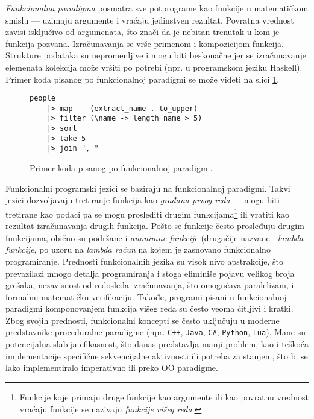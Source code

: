 \emph{Funkcionalna paradigma} posmatra sve potprograme kao funkcije u matematičkom smislu --- uzimaju argumente i vraćaju jedinstven rezultat. Povratna vrednost zavisi isključivo od argumenata, što znači da je nebitan trenutak u kom je funkcija pozvana. Izračunavanja se vrše primenom i kompozicijom funkcija. Strukture podataka su nepromenljive i mogu biti beskonačne jer se izračunavanje elemenata kolekcija može vršiti po potrebi (npr. u programskom jeziku Haskell). Primer koda pisanog po funkcionalnoj paradigmi se može videti na slici \ref{fig:ParadigmFunctional}.

\begin{figure}[h!]
\begin{lstlisting}
people 
    |> map    (extract_name . to_upper) 
    |> filter (\name -> length name > 5) 
    |> sort
    |> take 5
    |> join ", "
\end{lstlisting}
\caption{Primer koda pisanog po funkcionalnoj paradigmi.}
\label{fig:ParadigmFunctional}
\end{figure}
    
Funkcionalni programski jezici se baziraju na funkcionalnoj paradigmi. Takvi jezici dozvoljavaju tretiranje funkcija kao \emph{građana prvog reda} --- mogu biti tretirane kao podaci pa se mogu proslediti drugim funkcijama\footnote{Funkcije koje primaju druge funkcije kao argumente ili kao povratnu vrednost vraćaju funkcije se nazivaju \emph{funkcije višeg reda}.} ili vratiti kao rezultat izračunavanja drugih funkcija. Pošto se funkcije često prosleđuju drugim funkcijama, obično su podržane i \emph{anonimne funkcije} (drugačije nazvane i \emph{lambda funkcije}, po uzoru na \emph{lambda račun} na kojem je zasnovano funkcionalno programiranje. Prednosti funkcionalnih jezika su visok nivo apstrakcije, što prevazilazi mnogo detalja programiranja i stoga eliminiše pojavu velikog broja grešaka, nezavisnost od redosleda izračunavanja, što omogućava paralelizam, i formalnu matematičku verifikaciju. Takođe, programi pisani u funkcionalnoj paradigmi komponovanjem funkcija višeg reda su često veoma čitljivi i kratki. Zbog svojih prednosti, funkcionalni koncepti se često uključuju u moderne predstavnike proceduralne paradigme (npr. \texttt{C++}, \texttt{Java}, \texttt{C\#}, \texttt{Python}, \texttt{Lua}). Mane su potencijalna slabija efikasnost, što danas predstavlja manji problem, kao i teškoća implementacije specifične sekvencijalne aktivnosti ili potreba za stanjem, što bi se lako implementiralo imperativno ili preko OO paradigme. 
